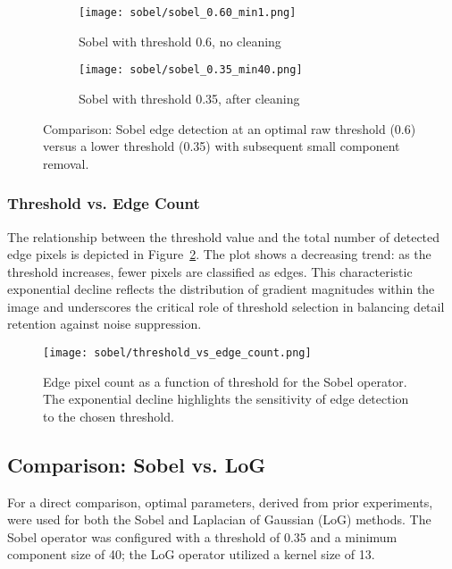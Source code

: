 \documentclass[12pt,a4paper]{article}
\begin{document}
\begin{figure}[H]
    \centering
    \begin{subfigure}{0.48\textwidth}
        \texttt{[image: sobel/sobel\_0.60\_min1.png]}
        \caption{Sobel with threshold 0.6, no cleaning}
    \end{subfigure}
    \hfill
    \begin{subfigure}{0.48\textwidth}
        \texttt{[image: sobel/sobel\_0.35\_min40.png]}
        \caption{Sobel with threshold 0.35, after cleaning}
    \end{subfigure}
    \caption{Comparison: Sobel edge detection at an optimal raw threshold (0.6) versus a lower threshold (0.35) with subsequent small component removal.}
    \label{fig:sobel_threshold_vs_cleaning_comparison}
\end{figure}



\subsubsection*{Threshold vs. Edge Count}
The relationship between the threshold value and the total number of detected edge pixels is depicted in Figure~\ref{fig:sobel_edge_count_plot}. The plot shows a decreasing trend: as the threshold increases, fewer pixels are classified as edges. This characteristic exponential decline reflects the distribution of gradient magnitudes within the image and underscores the critical role of threshold selection in balancing detail retention against noise suppression. 


\begin{figure}[H]
    \centering
     \texttt{[image: sobel/threshold\_vs\_edge\_count.png]}
    \caption{Edge pixel count as a function of threshold for the Sobel operator. The exponential decline highlights the sensitivity of edge detection to the chosen threshold.}
    \label{fig:sobel_edge_count_plot}
\end{figure}




\subsection{Comparison: Sobel vs. LoG}

For a direct comparison, optimal parameters, derived from prior experiments, were used for both the Sobel and Laplacian of Gaussian (LoG) methods. The Sobel operator was configured with a threshold of 0.35 and a minimum component size of 40; the LoG operator utilized a kernel size of 13.
\end{document}
